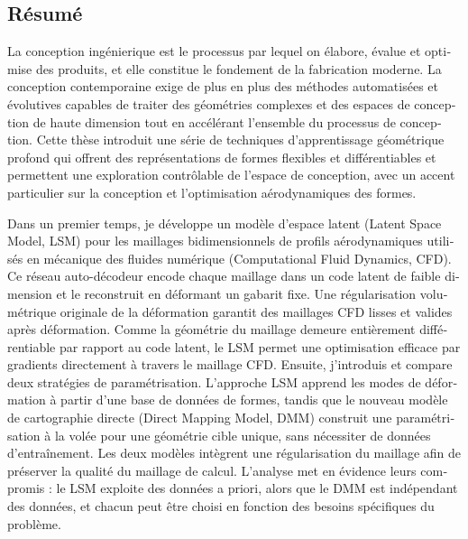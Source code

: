 \begin{otherlanguage}{french}
\cleardoublepage
\chapter*{Résumé}

La conception ingénierique est le processus par lequel on élabore, évalue et optimise des produits, et elle constitue le fondement de la fabrication moderne. La conception contemporaine exige de plus en plus des méthodes automatisées et évolutives capables de traiter des géométries complexes et des espaces de conception de haute dimension tout en accélérant l’ensemble du processus de conception. Cette thèse introduit une série de techniques d’apprentissage géométrique profond qui offrent des représentations de formes flexibles et différentiables et permettent une exploration contrôlable de l’espace de conception, avec un accent particulier sur la conception et l’optimisation aérodynamiques des formes.

Dans un premier temps, je développe un modèle d’espace latent (Latent Space Model, LSM) pour les maillages bidimensionnels de profils aérodynamiques utilisés en mécanique des fluides numérique (Computational Fluid Dynamics, CFD). Ce réseau auto-décodeur encode chaque maillage dans un code latent de faible dimension et le reconstruit en déformant un gabarit fixe. Une régularisation volumétrique originale de la déformation garantit des maillages CFD lisses et valides après déformation. Comme la géométrie du maillage demeure entièrement différentiable par rapport au code latent, le LSM permet une optimisation efficace par gradients directement à travers le maillage CFD. Ensuite, j’introduis et compare deux stratégies de paramétrisation. L’approche LSM apprend les modes de déformation à partir d’une base de données de formes, tandis que le nouveau modèle de cartographie directe (Direct Mapping Model, DMM) construit une paramétrisation à la volée pour une géométrie cible unique, sans nécessiter de données d’entraînement. Les deux modèles intègrent une régularisation du maillage afin de préserver la qualité du maillage de calcul. L’analyse met en évidence leurs compromis : le LSM exploite des données a priori, alors que le DMM est indépendant des données, et chacun peut être choisi en fonction des besoins spécifiques du problème.


\end{otherlanguage}

